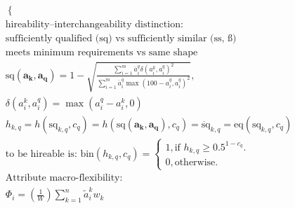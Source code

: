 \documentclass{article}
\begin{document}
\begin{gather}
\begin{cases}
    \end{cases}\\
    \text{hireability--interchangeability distinction:}\\
    \text{sufficiently qualified (sq) vs sufficiently similar (ss, \ss)}\\
    \text{meets minimum requirements vs same shape}\\
    \text{sq}(\boldsymbol{a_k},\boldsymbol{a_q}) = 
    1 - 
    \sqrt{
        \frac{
            \sum_{i=1}^{m}{
                \ddot{a}_{i}^{q}
                \delta(
                    {a}_{i}^{k},
                    {a}_{i}^{q}
                ) ^ 2
            }
        }{
            \sum_{i=1}^{m}{
                \ddot{a}_{i}^{q}
                \max(
                    100 - {a}_{i}^{q}, 
                    {a}_{i}^{q}
                ) ^ 2
            }
        }
    },\\
    \delta({a}_{i}^{k}, {a}_{i}^{q}) = 
    \max({a}_{i}^{q} - {a}_{i}^{k}, 0)\\
    h_{k,q}
    = h(\text{sq}_{k,q},c_{q})
    = h(\text{sq}(\boldsymbol{a_k},\boldsymbol{a_q}),c_{q}) 
    = \ddot{\text{sq}}_{k,q}
    = \text{eq}\left(
        \text{sq}_{k,q},
        c_{q}
    \right)\\
    \text{to be hireable is: }
    \text{bin}(h_{k,q}, c_{q}) = 
    \begin{cases}
        1, \text{if } h_{k,q} \geq 0.5 ^ {1 - c_{q}}.\\
        0, \text{otherwise}.
    \end{cases}\\
    \text{Attribute macro-flexibility:}\\
    \Phi_{i} = 
    \left(\frac{1}{W}\right)
    \sum_{k=1}^{n}{
        \tilde{a}_{i}^{k}
        w_{k}
    }
\end{gather}
\end{document}
